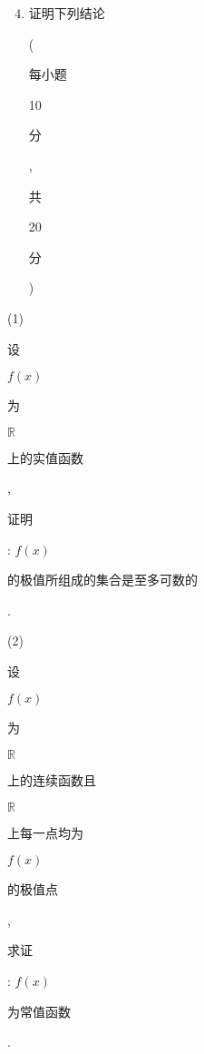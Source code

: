 \documentclass[10pt]{article}
\begin{document}
\begin{enumerate}
  \setcounter{enumi}{3}
  \item \begin{CJK}{UTF8}{mj}证明下列结论\end{CJK} (\begin{CJK}{UTF8}{mj}每小题\end{CJK} 10 \begin{CJK}{UTF8}{mj}分\end{CJK}, \begin{CJK}{UTF8}{mj}共\end{CJK} 20 \begin{CJK}{UTF8}{mj}分\end{CJK})
\end{enumerate}
(1) \begin{CJK}{UTF8}{mj}设\end{CJK} $f(x)$ \begin{CJK}{UTF8}{mj}为\end{CJK} $\mathbb{R}$ \begin{CJK}{UTF8}{mj}上的实值函数\end{CJK}, \begin{CJK}{UTF8}{mj}证明\end{CJK}: $f(x)$ \begin{CJK}{UTF8}{mj}的极值所组成的集合是至多可数的\end{CJK}.

(2) \begin{CJK}{UTF8}{mj}设\end{CJK} $f(x)$ \begin{CJK}{UTF8}{mj}为\end{CJK} $\mathbb{R}$ \begin{CJK}{UTF8}{mj}上的连续函数且\end{CJK} $\mathbb{R}$ \begin{CJK}{UTF8}{mj}上每一点均为\end{CJK} $f(x)$ \begin{CJK}{UTF8}{mj}的极值点\end{CJK}, \begin{CJK}{UTF8}{mj}求证\end{CJK}: $f(x)$ \begin{CJK}{UTF8}{mj}为常值函数\end{CJK}.
\end{document}
